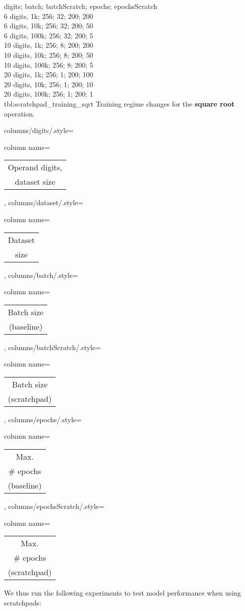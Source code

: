 {
	digits; batch; batchScratch; epochs; epochsScratch\\
	6 digits,  1k;  256; 32; 200; 200\\
	6 digits,  10k;  256; 32; 200; 50\\
	6 digits,  100k;  256; 32; 200; 5\\
	10 digits,  1k;  256; 8; 200; 200\\
	10 digits,  10k;  256; 8; 200; 50\\
	10 digits,  100k;  256; 8; 200; 5\\
	20 digits,  1k;  256; 1; 200; 100\\
	20 digits,  10k;  256; 1; 200; 10\\
	20 digits,  100k;  256; 1; 200; 1\\
}
{tbl:scratchpad_training_sqrt}
{
	Training regime changes for the \textbf{square root} operation.
}
{%
	columns/digits/.style={column name={\begin{tabular}{c}
				Operand digits, \\
				dataset size
	\end{tabular}}},
	columns/dataset/.style={column name={\begin{tabular}{c}
				Dataset \\
				size
	\end{tabular}}},
	columns/batch/.style={column name={\begin{tabular}{c}
				Batch size \\
				(baseline)
	\end{tabular}}},
	columns/batchScratch/.style={column name={\begin{tabular}{c}
				Batch size \\
				(scratchpad)
	\end{tabular}}},
	columns/epochs/.style={column name={\begin{tabular}{c}
				Max. \\
				\# epochs \\
				(baseline)
	\end{tabular}}},
	columns/epochsScratch/.style={column name={\begin{tabular}{c}
				Max. \\
				\# epochs \\
				(scratchpad)
	\end{tabular}}}
}


We thus run the following experiments to test model performance when using scratchpads:

